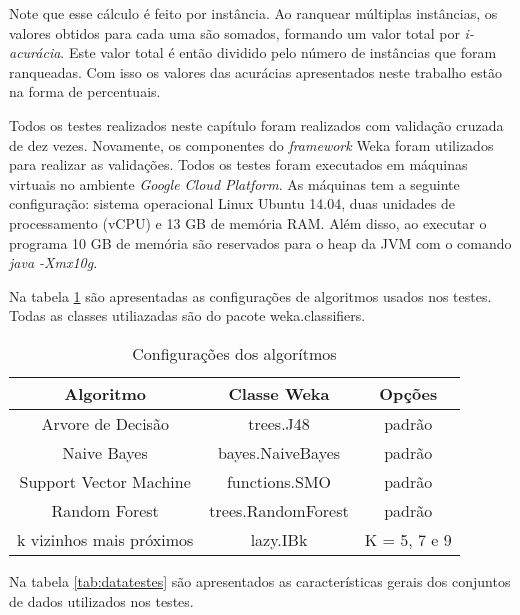 Note que esse cálculo é feito por instância. 
Ao ranquear múltiplas instâncias, os valores obtidos para cada uma são somados, formando um valor total por \textit{i-acurácia}.
Este valor total é então dividido pelo número de instâncias que foram ranqueadas.
Com isso os valores das acurácias apresentados neste trabalho estão na forma de percentuais.

Todos os testes realizados neste capítulo foram realizados com validação cruzada de dez vezes.
Novamente, os componentes do \textit{framework} Weka foram utilizados para realizar as validações.
Todos os testes foram executados em máquinas virtuais no ambiente \textit{Google Cloud Platform}. 
As máquinas tem a seguinte configuração: sistema operacional Linux Ubuntu 14.04, duas unidades de processamento (vCPU) e 13 GB de memória RAM.
Além disso, ao executar o programa 10 GB de memória são reservados para o heap da JVM com o comando \textit{java -Xmx10g}.

Na tabela \ref{tab:algoritmostestes} são apresentadas as configurações de algoritmos usados nos testes. Todas as classes utiliazadas são do pacote weka.classifiers.

\begin{table}[h!]
  \begin{center}
    \begin{tabular}{ccc}
      \hline
      Algoritmo & Classe Weka & Opções \\
      \hline

      Arvore de Decisão & trees.J48 & padrão \\
      Naive Bayes & bayes.NaiveBayes & padrão \\
      Support Vector Machine & functions.SMO & padrão \\
      Random Forest & trees.RandomForest & padrão \\
      k vizinhos mais próximos & lazy.IBk & K = 5, 7 e 9 \\

      \hline
    \end{tabular}
    \caption{Configurações dos algorítmos}
    \label{tab:algoritmostestes}
  \end{center}
\end{table}



Na tabela \ref{tab:datatestes} são apresentados as características gerais dos conjuntos de dados utilizados nos testes.

